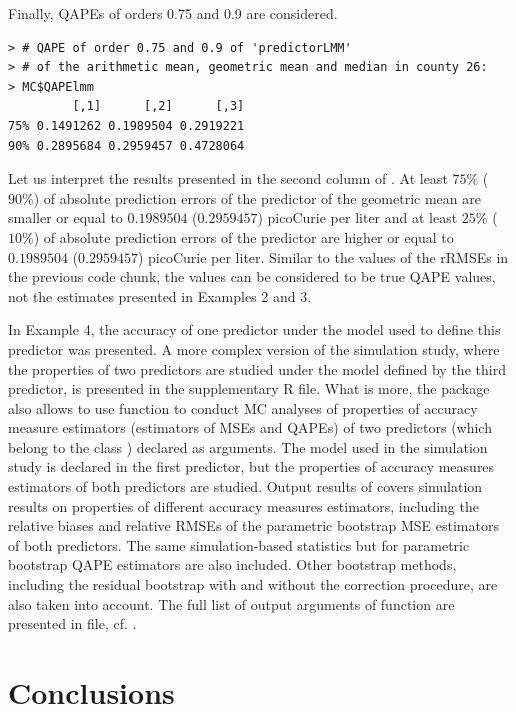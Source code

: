 Finally, QAPEs of orders 0.75 and 0.9 are considered.
\begin{verbatim}
> # QAPE of order 0.75 and 0.9 of 'predictorLMM'
> # of the arithmetic mean, geometric mean and median in county 26:
> MC$QAPElmm
         [,1]      [,2]      [,3]
75% 0.1491262 0.1989504 0.2919221
90% 0.2895684 0.2959457 0.4728064
\end{verbatim}

Let us interpret the results presented in the second column of . At least $75\%$ ($90\%$) of absolute prediction errors of the predictor of the geometric mean are smaller or equal to $0.1989504$ ($0.2959457$) picoCurie per liter and at least $25\%$ ($10\%$) of absolute prediction errors of the predictor are higher or equal to $0.1989504$ ($0.2959457$) picoCurie per liter. Similar to the values of the rRMSEs in the previous code chunk, the values can be considered to be true QAPE values, not the estimates presented in Examples 2 and 3.

In Example 4, the accuracy of one predictor under the model used to define this predictor was presented. A more complex version of the simulation study, where the properties of two predictors are studied under the model defined by the third predictor, is presented in the supplementary R file. What is more, the  package also allows to use  function to conduct MC analyses of properties of accuracy measure estimators (estimators of MSEs and QAPEs) of two predictors (which belong to the class ) declared as arguments. The model used in the simulation study is declared in the first predictor, but the properties of accuracy measures estimators of both predictors are studied. Output results of  covers simulation results on properties of different accuracy measures estimators, including the relative biases and relative RMSEs of the parametric bootstrap MSE estimators of both predictors. The same simulation-based statistics but for parametric bootstrap QAPE estimators are also included. Other bootstrap methods, including the residual bootstrap with and without the correction procedure, are also taken into account. The full list of output arguments of  function are presented in  file, cf. \cite{qape}.

\section{Conclusions}

